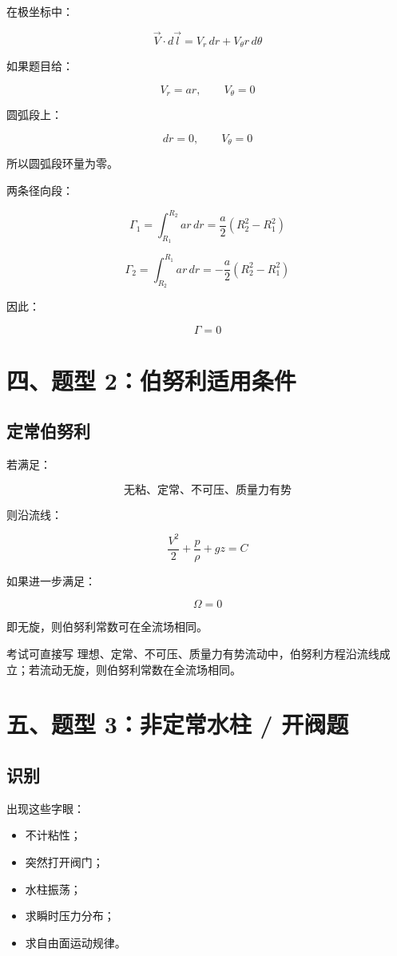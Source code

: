 \documentclass[11pt,a4paper]{ctexart}
\begin{document}
在极坐标中：

\[
\vec V\cdot d\vec l=V_r\,dr+V_\theta r\,d\theta
\]

如果题目给：

\[
V_r=ar,\qquad V_\theta=0
\]

圆弧段上：

\[
dr=0,\qquad V_\theta=0
\]

所以圆弧段环量为零。

两条径向段：

\[
\Gamma_1=\int_{R_1}^{R_2}ar\,dr
=\frac{a}{2}(R_2^2-R_1^2)
\]

\[
\Gamma_2=\int_{R_2}^{R_1}ar\,dr
=-\frac{a}{2}(R_2^2-R_1^2)
\]

因此：

\[
\boxed{\Gamma=0}
\]

\section*{四、题型 2：伯努利适用条件}

\subsection*{定常伯努利}

若满足：

\[
\text{无粘、定常、不可压、质量力有势}
\]

则沿流线：

\[
\boxed{
\frac{V^2}{2}+\frac{p}{\rho}+gz=C
}
\]

如果进一步满足：

\[
\Omega=0
\]

即无旋，则伯努利常数可在全流场相同。

\begin{greenbox}{考试可直接写}
理想、定常、不可压、质量力有势流动中，伯努利方程沿流线成立；若流动无旋，则伯努利常数在全流场相同。
\end{greenbox}

\section*{五、题型 3：非定常水柱 / 开阀题}

\subsection*{识别}

出现这些字眼：

\begin{itemize}
  \item 不计粘性；
  \item 突然打开阀门；
  \item 水柱振荡；
  \item 求瞬时压力分布；
  \item 求自由面运动规律。
\end{itemize}
\end{document}
